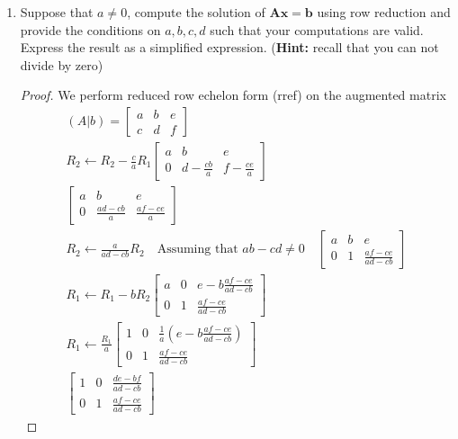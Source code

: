 \documentclass[11pt]{scrartcl}
\begin{document}
\begin{enumerate}[label=\alph*.]
	\item{
	      Suppose that $a\neq 0 $, compute the solution of $\mathbf{Ax = b}$
	      using row reduction and provide the conditions on $a,b,c,d$ such that your computations are valid.
	      Express the result as a simplified expression. (\textbf{Hint:} recall that you can not divide by zero)
	      \begin{proof}
		      We perform reduced row echelon form (rref) on the augmented matrix
		      \begin{align*}
			      (A|b)=
			      \left[\begin{array}{cc|c}
					      a & b & e \\
					      c & d & f
				      \end{array}\right] \\
			      R_2 \leftarrow R_2 - \frac{c}{a} R_1
			      \left[\begin{array}{cc|c}
					      a & b                & e                \\
					      0 & d - \frac{cb}{a} & f - \frac{ce}{a}
				      \end{array}\right] \\
			      \left[\begin{array}{cc|c}
					      a & b               & e               \\
					      0 & \frac{ad-cb}{a} & \frac{af-ce}{a}
				      \end{array}\right] \\
			      R_2 \leftarrow \frac{a}{ad-cb}R_2 \quad \text{Assuming that $ab-cd \neq 0$} \quad
			      \left[\begin{array}{cc|c}
					      a & b & e                   \\
					      0 & 1 & \frac{af-ce}{ad-cb}
					  \end{array}\right] \\
				R_1 \leftarrow R_1 - bR_2
				\left[\begin{array}{cc|c}
					a & 0 & e -b \frac{af-ce}{ad-cb} \\
					0 & 1 & \frac{af-ce}{ad-cb}
				\end{array}\right] \\
				R_1 \leftarrow \frac{R_1}{a}
				\left[\begin{array}{cc|c}
					1 & 0 & \frac{1}{a}(e -b \frac{af-ce}{ad-cb})\\
					0 & 1 & \frac{af-ce}{ad-cb}
				\end{array}\right] \\
				\left[\begin{array}{cc|c}
					1 & 0 & \frac{de-bf}{ad-cb} \\
					0 & 1 & \frac{af-ce}{ad-cb}
				\end{array}\right]
			  \end{align*}
			

\end{proof}}
\end{enumerate}
\end{document}
